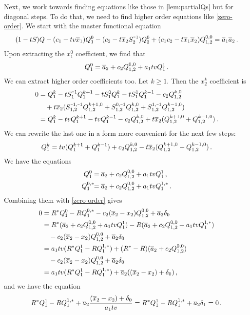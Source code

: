 Next, we work towards finding equations like those in \autoref{lem:partialQs} but for diagonal steps. To do that, we need to find higher order equations like \ref{zero-order}. We start with the master functional equation
\begin{align}
	(1-t S)Q - (c_1-t v\ol x_1) Q_1^0- (c_2-t\ol x_2S_2^{\um 1}) Q_2^0 + (c_1c_2-t\ol x_1\ol x_2)Q_{1,2}^{0,0}  = \ol a_1\ol a_2\,.
\end{align}
Upon extracting the $x_1^0$ coefficient, we find that
\begin{align}
	Q_1^0 =  \overline{a}_2 + c_2Q_{1,2}^{0,0} + a_1 t v Q_1^1\,.
\end{align}
We can extract higher order coefficients too. Let $k\geq 1$. Then the $x_2^k$ coefficient is
\begin{align}
	\begin{split}
		0 &= Q_1^k-t S_{1}^{\um 1}Q_1^{k + 1}-t S_1^{0}Q_1^k-t S_1^1Q_1^{k-1}-c_2\Qf{k,0} \\ 
		   &\quad + t\ol x_2(\Sf{\um 1,\um 1}\Qf{k + 1,0} + \Sf{0,\um 1}\Qf{k,0} + \Sf{1,\um 1}\Qf{k-1,0})\\
		   &=Q_1^k-t v Q_1^{k + 1}-t v Q_1^{k-1}-c_2\Qf{k,0} + t\ol x_2(\Qf{k + 1,0} + \Qf{k-1,0})\,.
	\end{split}
\end{align}
We can rewrite the last one in a form more convenient for the next few steps:
\begin{align}
	\label{formula}
	Q_1^k = tv(Q_1^{k + 1} + Q_1^{k-1}) + c_2 Q_{1,2}^{k,0} - t\overline{x}_2(Q_{1,2}^{k + 1,0} + Q_{1,2}^{k-1,0})\,.
\end{align}
We have the equations
\begin{align}
	Q_1^0 &=  \overline{a}_2 + c_2Q_{1,2}^{0,0} + a_1t v Q_1^1\,,\\
	Q_1^{0,\ast} \!\!&=  \overline{a}_2 + c_2Q_{1,2}^{0,0} + a_1t v Q_1^{1,\ast}\,.
\end{align}
Combining them with \autoref{zero-order} gives
\begin{align}
	\begin{split}
	        0 &= R^\ast Q_1^0 -R Q_1^{0,\ast} - c_2(\overline{x}_2-x_2)Q_{1,2}^{0,0} + \overline{a}_2\delta_0 \\
		&= R^\ast (  \overline{a}_2 + c_2Q_{1,2}^{0,0} + a_1t v Q_1^1) -R ( \overline{a}_2 + c_2Q_{1,2}^{0,0} + a_1t v Q_1^{1,\ast}) \\
		&\quad- c_2(\overline{x}_2-x_2)Q_{1,2}^{0,0} + \overline{a}_2\delta_0\\
		&=a_1tv(R^\ast Q_1^1-R Q_1^{1,\ast}) + (R^\ast-R)( \overline{a}_2 + c_2Q_{1,2}^{0,0}) \\
		&\quad- c_2(\overline{x}_2-x_2)Q_{1,2}^{0,0} + \overline{a}_2\delta_0\\
		& =a_1tv(R^\ast Q_1^1-R Q_1^{1,\ast}) + \overline{a}_2((\overline{x}_2-x_2) + \delta_0)\,,
	\end{split}
\end{align}
and we have the equation
\begin{align}
	R^\ast Q_1^1-R Q_1^{1,\ast} + \overline{a}_2\frac{(\overline{x}_2-x_2) + \delta_0}{a_1tv} = R^\ast Q_1^1-R Q_1^{1,\ast} + \overline{a}_2\delta_1 = 0\,.
\end{align}


